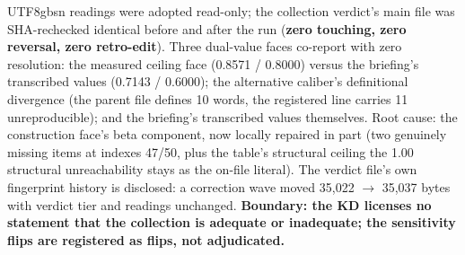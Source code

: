 \documentclass[11pt,letterpaper]{article}
\begin{document}
\begin{CJK}{UTF8}{gbsn}
readings were adopted read-only; the collection verdict's main file was SHA-rechecked identical before and after the run (\textbf{zero touching, zero reversal, zero retro-edit}). Three dual-value faces co-report with zero resolution: the measured ceiling face (0.8571 / 0.8000) versus the briefing's transcribed values (0.7143 / 0.6000); the alternative caliber's definitional divergence (the parent file defines 10 words, the registered line carries 11 \textemdash{} unreproducible); and the briefing's transcribed values themselves. Root cause: the construction face's beta component, now locally repaired in part (two genuinely missing items at indexes 47/50, plus the table's structural ceiling \textemdash{} the 1.00 structural unreachability stays as the on-file literal). The verdict file's own fingerprint history is disclosed: a correction wave moved 35,022 \ensuremath{\to} 35,037 bytes with verdict tier and readings unchanged. \textbf{Boundary: the KD licenses no statement that the collection is adequate or inadequate; the sensitivity flips are registered as flips, not adjudicated.}


\end{CJK}
\end{document}
